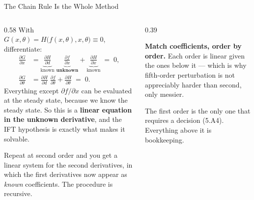 \begin{frame}{The Chain Rule Is the Whole Method}
\begin{columns}[T]
\begin{column}{0.58\textwidth}
\small
With $G(x,\theta)=H\big(f(x,\theta),x,\theta\big)\equiv 0$, differentiate:
\begin{align*}
  \frac{\partial G}{\partial x}
  &= \underbrace{\frac{\partial H}{\partial d}}_{\text{known}}\;
     \underbrace{\frac{\partial f}{\partial x}}_{\textbf{unknown}}
   + \underbrace{\frac{\partial H}{\partial x}}_{\text{known}} \;=\; 0, \\[2mm]
  \frac{\partial G}{\partial \theta}
  &= \frac{\partial H}{\partial d}\;\frac{\partial f}{\partial \theta}
   + \frac{\partial H}{\partial \theta} \;=\; 0 .
\end{align*}
Everything except $\partial f/\partial x$ can be evaluated at the steady state, because we know the steady state. So this is a \textbf{linear equation in the unknown derivative}, and the IFT hypothesis is exactly what makes it solvable.
\medskip

Repeat at second order and you get a linear system for the second derivatives, in which the first derivatives now appear as \emph{known} coefficients. The procedure is recursive.
\end{column}
\begin{column}{0.39\textwidth}
\begin{takeawaybox}\footnotesize
\textbf{Match coefficients, order by order.} Each order is linear given the ones below it --- which is why fifth-order perturbation is not appreciably harder than second, only messier.
\end{takeawaybox}
\medskip
\begin{cautionbox}\footnotesize
The first order is the only one that requires a decision (5.A4). Everything above it is bookkeeping.
\end{cautionbox}
\end{column}
\end{columns}
\vspace{1mm}
\end{frame}

